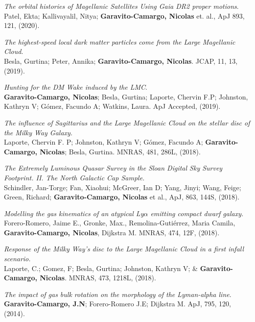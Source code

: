 \documentclass[UTF8]{article}
\begin{document}
\begin{etaremune}
\item \textit{The orbital histories of Magellanic Satellites Using Gaia DR2
  proper motions}. \\
  Patel, Ekta; Kallivayalil, Nitya; \textbf{Garavito-Camargo, Nicolas} et. al.,
  ApJ 893, 121, (2020).
\item \textit{The highest-speed local dark matter particles come from the Large
  Magellanic Cloud}. \\
  Besla, Gurtina; Peter, Annika; \textbf{Garavito-Camargo, Nicolas}. JCAP, 11,
  13, (2019).
\item \textit{Hunting for the DM Wake induced by the LMC}.\\
  \textbf{Garavito-Camargo, Nicolas}; Besla, Gurtina; Laporte, Chervin F.P;
  Johnston, Kathryn V; G\'omez, Facundo A; Watkins, Laura. ApJ Accepted, (2019).
\item \textit{The influence of Sagittarius and the Large Magellanic Cloud on the
  stellar disc of the Milky Way Galaxy.}\\
  Laporte, Chervin F. P; Johnston, Kathryn V; G\'omez, Facundo A; \textbf{Garavito-Camargo, Nicolas}; Besla,
  Gurtina. MNRAS, 481, 286L, (2018).
\item \textit{The Extremely Luminous Quasar Survey in the Sloan Digital Sky
  Survey Footprint. II. The North Galactic Cap Sample.}\\ Schindler, Jan-Torge;
  Fan, Xiaohui; McGreer, Ian D; Yang, Jinyi; Wang, Feige; Green, Richard;
  \textbf{Garavito-Camargo, Nicolas} et al., ApJ, 863, 144S, (2018).
\item \textit{Modelling the gas kinematics of an atypical Ly$\alpha$
emitting compact dwarf galaxy.}\\  Forero-Romero, Jaime E., Gronke, Max.,
Remolina-Gutiérrez, Maria Camila, \textbf{Garavito-Camargo, Nicolas}, Dijkstra
M. MNRAS, 474, 12F, (2018).
\item \textit{Response of the Milky Way's disc to the Large Magellanic Cloud in
  a first infall scenario.}\\ Laporte, C.; Gomez, F; Besla, Gurtina; Johnston,
  Kathryn V; \& \textbf{Garavito-Camargo, Nicolas}. MNRAS, 473, 1218L, (2018).
 \item \textit{The impact of gas bulk rotation on the morphology of the
   Lyman-alpha line}.\\ \textbf{Garavito-Camargo, J.N}; Forero-Romero J.E;
   Dijkstra M. ApJ, 795, 120, (2014).
\end{etaremune}
\end{document}
